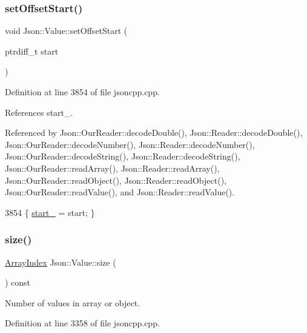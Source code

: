 \subsubsection{\texorpdfstring{set\+Offset\+Start()}{setOffsetStart()}}
{\footnotesize\ttfamily void Json\+::\+Value\+::set\+Offset\+Start (\begin{DoxyParamCaption}\item[{ptrdiff\+\_\+t}]{start }\end{DoxyParamCaption})}



Definition at line 3854 of file jsoncpp.\+cpp.



References start\+\_\+.



Referenced by Json\+::\+Our\+Reader\+::decode\+Double(), Json\+::\+Reader\+::decode\+Double(), Json\+::\+Our\+Reader\+::decode\+Number(), Json\+::\+Reader\+::decode\+Number(), Json\+::\+Our\+Reader\+::decode\+String(), Json\+::\+Reader\+::decode\+String(), Json\+::\+Our\+Reader\+::read\+Array(), Json\+::\+Reader\+::read\+Array(), Json\+::\+Our\+Reader\+::read\+Object(), Json\+::\+Reader\+::read\+Object(), Json\+::\+Our\+Reader\+::read\+Value(), and Json\+::\+Reader\+::read\+Value().


\begin{DoxyCode}
3854 \{ \hyperlink{class_json_1_1_value_a1c3aeb0fa8fefe93776cb347c76a25a8}{start\_} = start; \}
\end{DoxyCode}
\mbox{\label{class_json_1_1_value_a0ec2808e1d7efa4e9fad938d6667be44}} 
\subsubsection{\texorpdfstring{size()}{size()}}
{\footnotesize\ttfamily \hyperlink{class_json_1_1_value_a184a91566cccca7b819240f0d5561c7d}{Array\+Index} Json\+::\+Value\+::size (\begin{DoxyParamCaption}{ }\end{DoxyParamCaption}) const}



Number of values in array or object. 



Definition at line 3358 of file jsoncpp.\+cpp.



